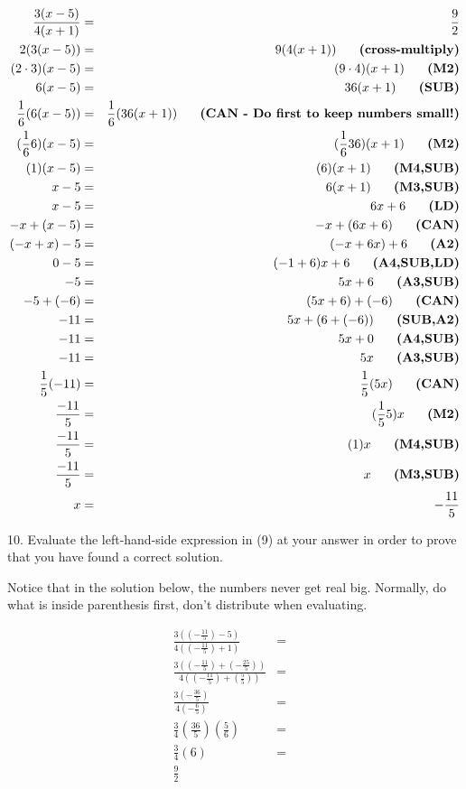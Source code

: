 \documentclass[letterpaper, 12pt]{article}
\begin{document}
\newcommand{\tag}[1]{\hspace{0.25in}\mbox{\textbf{(#1)}}}

\begin{eqnarray*}
\frac{3(x-5)}{4(x+1)} &=& \frac{9}{2} \\
2(3(x-5)) &=& 9(4(x+1))\tag{cross-multiply}\\
(2\cdot3)(x-5) &=& (9\cdot4)(x+1)\tag{M2} \\
6(x-5) &=& 36(x+1)\tag{SUB} \\
\frac{1}{6}(6(x-5)) &=& \frac{1}{6}(36(x+1))
    \tag{CAN - Do first to keep numbers small!}\\
(\frac{1}{6}6)(x-5) &=& (\frac{1}{6}36)(x+1)\tag{M2} \\
(1)(x-5) &=& (6)(x+1)\tag{M4,SUB} \\
x-5 &=& 6(x+1)\tag{M3,SUB} \\
x-5 &=& 6x+6\tag{LD} \\
-x+(x-5) &=& -x+(6x+6)\tag{CAN} \\
(-x+x)-5 &=& (-x+6x)+6\tag{A2} \\
0-5 &=& (-1+6)x+6\tag{A4,SUB,LD} \\
-5 &=& 5x+6\tag{A3,SUB} \\
-5+(-6) &=& (5x+6)+(-6)\tag{CAN} \\
-11 &=& 5x+(6+(-6))\tag{SUB,A2} \\
-11 &=& 5x+0\tag{A4,SUB} \\
-11 &=& 5x\tag{A3,SUB} \\
\frac{1}{5}(-11) &=& \frac{1}{5}(5x)\tag{CAN} \\
\frac{-11}{5} &=& (\frac{1}{5}5)x\tag{M2} \\
\frac{-11}{5} &=& (1)x\tag{M4,SUB} \\
\frac{-11}{5} &=& x\tag{M3,SUB} \\
x &=& -\frac{11}{5} \\
\end{eqnarray*}

\bigskip

10. Evaluate the left-hand-side expression in (9) at your answer in order to
prove that you have found a correct solution.

\bigskip

Notice that in the solution below, the numbers never get real big.  Normally,
do what is inside parenthesis first, don't distribute when evaluating.

\begin{eqnarray*}
\frac{3\left(\left(-\frac{11}{5}\right)-5\right)}
    {4\left(\left(-\frac{11}{5}\right)+1\right)} &=& \\
\frac{3\left(\left(-\frac{11}{5}\right)+\left(-\frac{25}{5}\right)\right)}
    {4\left(\left(-\frac{11}{5}\right)+\left(\frac{5}{5}\right)\right)} &=& \\
\frac{3\left(-\frac{36}{5}\right)}{4\left(-\frac{6}{5}\right)} &=& \\
\frac{3}{4}\left(\frac{36}{5}\right)\left(\frac{5}{6}\right) &=& \\
\frac{3}{4}(6) &=& \\
\frac{9}{2} \\
\end{eqnarray*}
\end{document}
